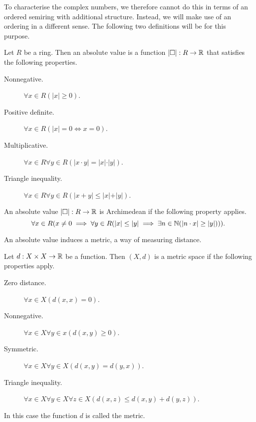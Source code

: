\documentclass[../main.tex]{subfiles}
\begin{document}
To characterise the complex numbers, we therefore cannot do this in terms of an ordered semiring with additional structure. Instead, we will make use of an ordering in a different sense. The following two definitions will be for this purpose.
\begin{definition}
    Let $R$ be a ring. Then an absolute value is a function $\vert\Box\vert:R\to\mathbb{R}$ that satisfies the following properties.
    \begin{description}
        \item[Nonnegative.] $\forall x\in R(\vert x\vert\geq0)$.
        \item[Positive definite.] $\forall x\in R(\vert x\vert=0\iff x=0)$.
        \item[Multiplicative.] $\forall x\in R\forall y\in R(\vert x\cdot y\vert=\vert x\vert\cdot\vert y\vert)$.
        \item[Triangle inequality.] $\forall x\in R\forall y\in R(\vert x+y\vert\leq\vert x\vert+\vert y\vert)$.
    \end{description}
\end{definition}
\begin{definition}
    An absolute value $\vert\Box\vert:R\to\mathbb{R}$ is Archimedean if the following property applies.
    \begin{equation*}
        \forall x\in R(x\neq0\implies\forall y\in R(\vert x\vert\leq\vert y\vert\implies\exists n\in\mathbb{N}(\vert n\cdot x\vert\geq\vert y\vert))).
    \end{equation*}
\end{definition}
An absolute value induces a metric, a way of measuring distance.
\begin{definition}
    Let $d:X\times X\to\mathbb{R}$ be a function. Then $(X,d)$ is a metric space if the following properties apply.
    \begin{description}
        \item[Zero distance.] $\forall x\in X(d(x,x)=0)$.
        \item[Nonnegative.] $\forall x\in X\forall y\in x(d(x,y)\geq0)$.
        \item[Symmetric.] $\forall x\in X\forall y\in X(d(x,y)=d(y,x))$.
        \item[Triangle inequality.] $\forall x\in X\forall y\in X\forall z\in X(d(x,z)\leq d(x,y)+d(y,z))$.
    \end{description}
    In this case the function $d$ is called the metric.
\end{definition}
\end{document}
